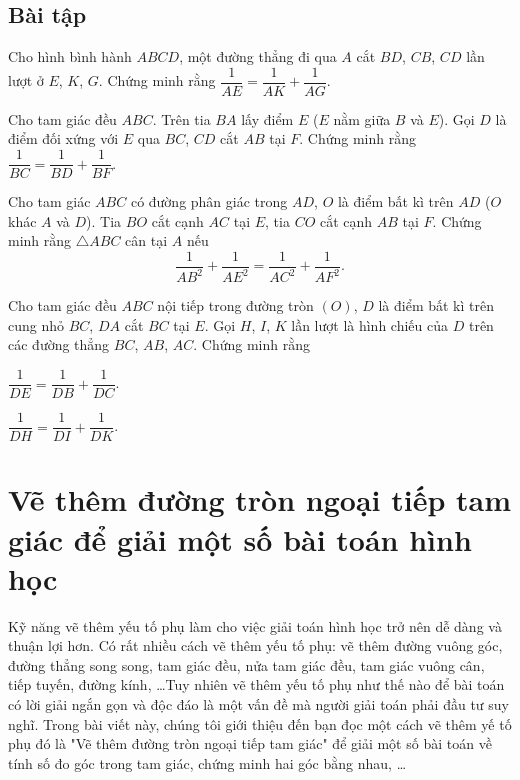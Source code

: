 \subsection*{Bài tập}
\begin{bt}%
Cho hình bình hành $ABCD$, một đường thẳng đi qua $A$ cắt $BD$, $CB$, $CD$ lần lượt ở $E$, $K$, $G$. Chứng minh rằng $\dfrac{1}{AE}=\dfrac{1}{AK}+\dfrac{1}{AG}.$
\end{bt}
\begin{bt}%
Cho tam giác đều $ABC$. Trên tia $BA$ lấy điểm $E$ ($E$ nằm giữa $B$ và $E$). Gọi $D$ là điểm đối xứng với $E$ qua $BC$, $CD$ cắt $AB$ tại $F$. Chứng minh rằng $\dfrac{1}{BC}=\dfrac{1}{BD}+\dfrac{1}{BF}.$
\end{bt}
\begin{bt}%
Cho tam giác $ABC$ có đường phân giác trong $AD$, $O$ là điểm bất kì trên $AD$ ($O$ khác $A$ và $D$). Tia $BO$ cắt cạnh $AC$ tại $E$, tia $CO$ cắt cạnh $AB$ tại $F$. Chứng minh rằng $\triangle ABC$ cân tại $A$ nếu $$\dfrac{1}{AB^2}+\dfrac{1}{AE^2}=\dfrac{1}{AC^2}+\dfrac{1}{AF^2}.$$
\end{bt}
\begin{bt}%
Cho tam giác đều $ABC$ nội tiếp trong đường tròn $(O)$, $D$ là điểm bất kì trên cung nhỏ $BC$, $DA$ cắt $BC$ tại $E$. Gọi $H$, $I$, $K$ lần lượt là hình chiếu của $D$ trên các đường thẳng $BC$, $AB$, $AC$. Chứng minh rằng
\begin{listEX}[2]
\item $\dfrac{1}{DE}=\dfrac{1}{DB}+\dfrac{1}{DC}$.
\item $\dfrac{1}{DH}=\dfrac{1}{DI}+\dfrac{1}{DK}$.
\end{listEX}
\end{bt}

\setcounter{bt}{0}
\section{Vẽ thêm đường tròn ngoại tiếp tam giác để giải một số bài toán hình học}
\begin{center}
\textbf{\color{violet}{Đỗ Quang Minh\\
(GV THPT Nguyễn Bá Ngọc, An Xuânm Tuy An, Phú Yên)}}
\end{center}
Kỹ năng vẽ thêm yếu tố phụ làm cho việc giải toán hình học trở nên dễ dàng và thuận lợi hơn. Có rất nhiều cách vẽ thêm yếu tố phụ: vẽ thêm đường vuông góc, đường thẳng song song, tam giác đều, nửa tam giác đều, tam giác vuông cân, tiếp tuyến, đường kính, \ldots Tuy nhiên vẽ thêm yếu tố phụ như thế nào để bài toán có lời giải ngắn gọn và độc đáo là một vấn đề mà người giải toán phải đầu tư suy nghĩ. Trong bài viết này, chúng tôi giới thiệu đến bạn đọc một cách vẽ thêm yế tố phụ đó là "Vẽ thêm đường tròn ngoại tiếp tam giác" để giải một số bài toán về tính số đo góc trong tam giác, chứng minh hai góc bằng nhau, \ldots

